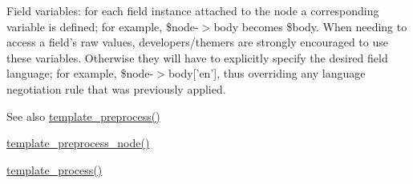 Field variables: for each field instance attached to the node a corresponding variable is defined; for example, \$node-\/$>$body becomes \$body. When needing to access a field's raw values, developers/themers are strongly encouraged to use these variables. Otherwise they will have to explicitly specify the desired field language; for example, \$node-\/$>$body\mbox{[}'en'\mbox{]}, thus overriding any language negotiation rule that was previously applied.

\begin{DoxySeeAlso}{See also}
\hyperlink{includes_2theme_8inc_a3eeb7bcdba7ef4859f99586da264d347}{template\_\-preprocess()} 

\hyperlink{node_8module_abba818ede4c18fb7d92f0a5d5f1aa771}{template\_\-preprocess\_\-node()} 

\hyperlink{includes_2theme_8inc_a9b4d56c55dab2c59b7af6f71d6b1a940}{template\_\-process()} 
\end{DoxySeeAlso}
